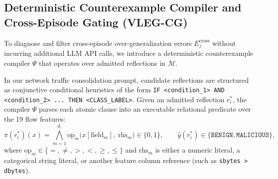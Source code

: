 \documentclass[10pt,a4paper,onecolumn]{article}
\theoremstyle{definition}
\theoremstyle{remark}
\begin{document}
\subsection{Deterministic Counterexample Compiler and Cross-Episode Gating (VLEG-CG)}
\label{sec:counterexample_gate}
To diagnose and filter cross-episode over-generalization errors $E_j^{\mathrm{cross}}$ without incurring additional LLM API calls, we introduce a deterministic counterexample compiler $\Psi$ that operates over admitted reflections in $\mathcal{M}$.

In our network traffic consolidation prompt, candidate reflections are structured as conjunctive conditional heuristics of the form \texttt{IF <condition\_1> AND <condition\_2> ... THEN <CLASS\_LABEL>}. Given an admitted reflection $r_i^*$, the compiler $\Psi$ parses each atomic clause into an executable relational predicate over the 19 flow features:
\begin{equation}
    \pi(r_i^*)(x) = \bigwedge_{m=1}^{d_i} \mathrm{op}_m\big(x[\mathrm{field}_m],\; \mathrm{rhs}_m\big) \in \{0, 1\}, \qquad \hat{y}(r_i^*) \in \{\texttt{BENIGN}, \texttt{MALICIOUS}\},
    \label{eq:compiler_pred}
\end{equation}
where $\mathrm{op}_m \in \{=, \neq, >, <, \ge, \le\}$ and $\mathrm{rhs}_m$ is either a numeric literal, a categorical string literal, or another feature column reference (such as \texttt{sbytes > dbytes}).
\end{document}
